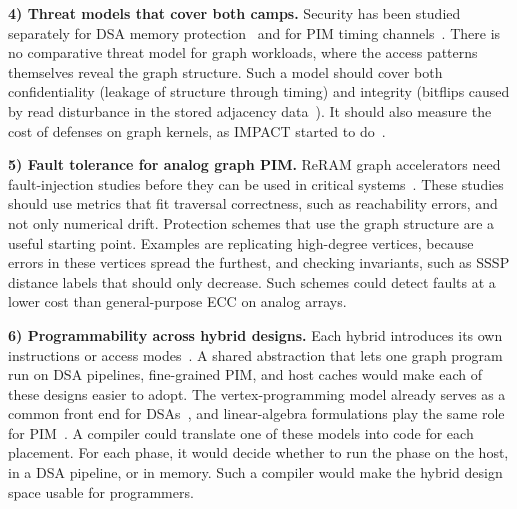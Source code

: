 \documentclass[journal,onecolumn]{IEEEtran}
\begin{document}
\textbf{4) Threat models that cover both camps.} Security has been studied separately for DSA memory protection~\cite{hua2022mgx} and for PIM timing channels~\cite{bostanci2025impact}. There is no comparative threat model for graph workloads, where the access patterns themselves reveal the graph structure. Such a model should cover both confidentiality (leakage of structure through timing) and integrity (bitflips caused by read disturbance in the stored adjacency data~\cite{yuksel2026pid}). It should also measure the cost of defenses on graph kernels, as IMPACT started to do~\cite{bostanci2025impact}.

\textbf{5) Fault tolerance for analog graph PIM.} ReRAM graph accelerators need fault-injection studies before they can be used in critical systems~\cite{song2018graphr,zheng2020spara}. These studies should use metrics that fit traversal correctness, such as reachability errors, and not only numerical drift. Protection schemes that use the graph structure are a useful starting point. Examples are replicating high-degree vertices, because errors in these vertices spread the furthest, and checking invariants, such as SSSP distance labels that should only decrease. Such schemes could detect faults at a lower cost than general-purpose ECC on analog arrays.

\textbf{6) Programmability across hybrid designs.} Each hybrid introduces its own instructions or access modes~\cite{shin2025piccolo,shin2025fala,yenimol2026cograf}. A shared abstraction that lets one graph program run on DSA pipelines, fine-grained PIM, and host caches would make each of these designs easier to adopt. The vertex-programming model already serves as a common front end for DSAs~\cite{ham2016graphicionado}, and linear-algebra formulations play the same role for PIM~\cite{barkhordar2025alphapim}. A compiler could translate one of these models into code for each placement. For each phase, it would decide whether to run the phase on the host, in a DSA pipeline, or in memory. Such a compiler would make the hybrid design space usable for programmers.

\end{document}
